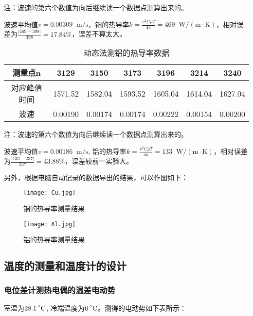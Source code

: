 \documentclass[11pt]{article}
\newcommand*{\unit}[1]{\mathop{}\!\mathrm{#1}}
\newcommand*{\mcelsius}{\unit{\prescript{\circ}{}C}}
\begin{document}
注：波速的第六个数值为向后继续读一个数据点测算出来的。

波速平均值$v=0.00309 \unit{m/s}$，铜的热导率$k = \frac{v^2C\rho T}{4\pi} = 469 \unit{W/(m\cdot K)}$，相对误差为$\frac{|469-398|}{398} = 17.84 \%$，误差不算太大。

\begin{table}[H]
  \centering
  \caption{动态法测铝的热导率数据}
  \begin{tabular}{|c|c|c|c|c|c|c|}
      \hline
      测量点n&3129  & 3150  & 3173  & 3196  & 3214  & 3240 \\
      \hline
      对应峰值时间&1571.52 & 1582.04 & 1593.52 & 1605.04 & 1614.04 & 1627.04 \\
      \hline
      波速&0.00190  & 0.00174  & 0.00174  & 0.00222  & 0.00154  & 0.00200  \\
      \hline
  \end{tabular}
\end{table}

注：波速的第六个数值为向后继续读一个数据点测算出来的。

波速平均值$v=0.00186 \unit{m/s}$, 铝的热导率$k = \frac{v^2C\rho T}{4\pi} = 133 \unit{W/(m\cdot K)}$，相对误差为$\frac{|133-237|}{237} = 43.88 \%$，误差较前一实验大。

另外，根据电脑自动记录的数据导出的结果，可以作图如下：

\begin{figure}[H]
  \begin{minipage}[t]{0.6\linewidth}
      \centering
      \texttt{[image: Cu.jpg]}
      \caption{铜的热导率测量结果}
  \end{minipage}
  \begin{minipage}[t]{0.39\linewidth}
      \centering
      \texttt{[image: Al.jpg]}
      \caption{铝的热导率测量结果}
  \end{minipage}
\end{figure}

\subsection{温度的测量和温度计的设计}

\subsubsection{电位差计测热电偶的温差电动势}

室温为$28.1\mcelsius$, 冷端温度为$0\mcelsius$。测得的电动势如下表所示：
\end{document}
